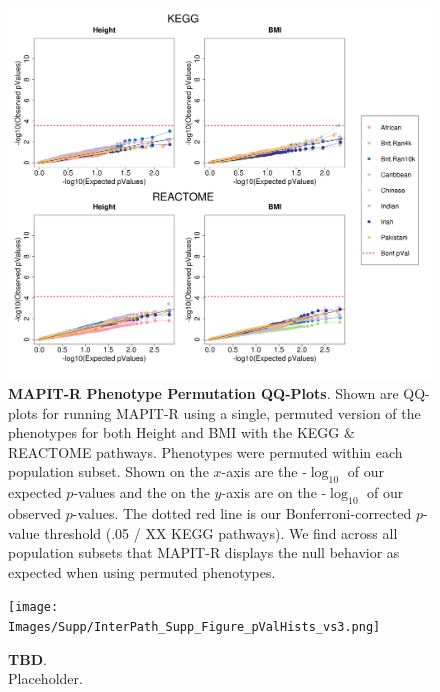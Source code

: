 \documentclass[12pt, a4paper]{article}
\begin{document}
\begin{figure}[htbp]
\centering
\includegraphics[scale=.35]{Images/Supp/InterPath_Supp_Figure_perm1_QQPlots_AllPaths_vs1.png}
\caption[TBD]{\textbf{MAPIT-R Phenotype Permutation QQ-Plots}. Shown are QQ-plots for running MAPIT-R using a single, permuted version of the phenotypes for both Height and BMI with the KEGG \& REACTOME pathways. Phenotypes were permuted within each population subset. Shown on the $x$-axis are the -$\log_{10}$ of our expected $p$-values and the on the $y$-axis are on the -$\log_{10}$ of our observed $p$-values. The dotted red line is our Bonferroni-corrected $p$-value threshold (.05 / XX KEGG pathways). We find across all population subsets that MAPIT-R displays the null behavior as expected when using permuted phenotypes.}
\label{InterPath-Supp-Figure-perm1-QQPlots-AllPaths}
\end{figure}
\clearpage

\begin{figure}[htbp]
\centering
\vspace*{-2cm}
\texttt{[image: Images/Supp/InterPath\_Supp\_Figure\_pValHists\_vs3.png]}
\caption[TBD]{\textbf{TBD}. \\ Placeholder.}
\label{InterPath-Supp-Figure-10perms-pValHists}
\end{figure}
\clearpage
\end{document}

